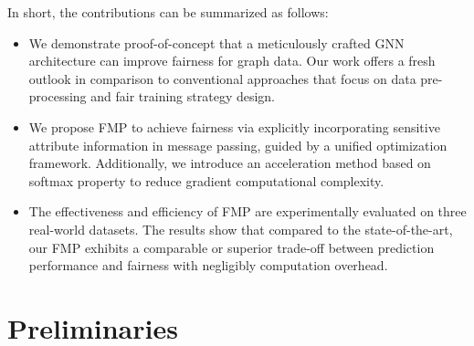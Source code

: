 \documentclass[letterpaper]{article} %
\theoremstyle{plain}
\theoremstyle{definition}
\theoremstyle{remark}
\begin{document}
In short, the contributions can be summarized as follows:
\begin{itemize}[leftmargin=0.6cm, itemindent=.0cm, itemsep=0.0cm, topsep=0.0cm]
    \item We demonstrate proof-of-concept that a meticulously crafted GNN architecture can improve fairness for graph data. Our work offers a fresh outlook in comparison to conventional approaches that focus on data pre-processing and fair training strategy design.

    \item We propose FMP to achieve fairness via explicitly incorporating sensitive attribute information in message passing, guided by a unified optimization framework. Additionally, we introduce an acceleration method based on softmax property to reduce gradient computational complexity. 
    \item  The effectiveness and efficiency of FMP are experimentally evaluated on three real-world datasets. The results show that compared to the state-of-the-art, our FMP exhibits a comparable or superior trade-off between prediction performance and fairness with negligibly computation overhead. 
\end{itemize}


\section{Preliminaries}
\end{document}

